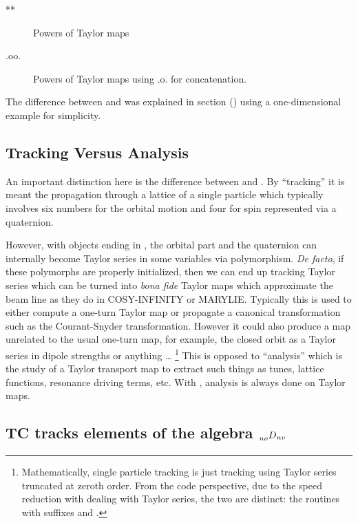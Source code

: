 \documentclass{hitec}     %
\begin{document}
{{{\begin{description}
\item[**] \Newline   Powers of Taylor maps

\item[.oo.] \Newline Powers of Taylor maps using .o. for concatenation.

\end{description}

The difference between  and \vn{*} was explained in section () using a one-dimensional example for simplicity.  

\subsection{Tracking Versus Analysis}
\label{s:tracking.analysis}

An important distinction here is the difference between  and . By
``tracking'' it is meant  the propagation through a lattice of a single particle {\color{h} which typically 
involves six  numbers for the orbital motion and four   for spin represented via a quaternion.}

{\color{h} However,  with  objects ending in  , the orbital part and the quaternion can   internally become Taylor series in some variables via polymorphism.
{\it De facto}, if these polymorphs are properly initialized, then we can end up tracking Taylor series which can be turned into {\it bona fide} Taylor maps which approximate the beam line as they do in COSY-INFINITY or MARYLIE. Typically this is used to either compute a one-turn Taylor map or propagate a 
canonical transformation such as the Courant-Snyder transformation. However it could also produce a map unrelated to the usual one-turn map, for example, the closed orbit as a Taylor series in  dipole strengths or anything \ldots}
 \footnote
  {
Mathematically, single particle tracking is just tracking  using Taylor series
truncated at zeroth order. From the code perspective, due to the speed reduction with dealing with
Taylor series, the two are distinct: the routines with suffixes  and .
  }
This is opposed to ``analysis'' which is the study of a {\color{h} Taylor} transport map to extract such things as
tunes, lattice functions, resonance driving terms, etc. With , analysis is always done on  {\color{h} Taylor}  maps.

\subsection{TC tracks elements of the algebra $\prescript{}{no}{D}_{nv}$
}
\label{s:tpsadef}

}}}
\end{document}
